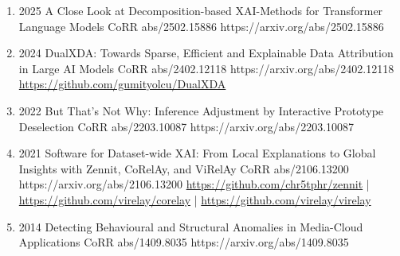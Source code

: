 {\begin{enumerate}
                        
        \item {}
                        {2025}
                        {A Close Look at Decomposition-based XAI-Methods for Transformer Language Models}
                        {CoRR abs/2502.15886}
                        {https://arxiv.org/abs/2502.15886}
                        

        \item {}
                        {2024}
                        {DualXDA: Towards Sparse, Efficient and Explainable Data Attribution in Large AI Models}
                        {CoRR abs/2402.12118}
                        {https://arxiv.org/abs/2402.12118}
                        {\\\href{https://github.com/gumityolcu/DualXDA}{https://github.com/gumityolcu/DualXDA}}
                        

        \item {}
                        {2022}
                        {But That's Not Why: Inference Adjustment by Interactive Prototype Deselection}
                        {CoRR abs/2203.10087}
                        {https://arxiv.org/abs/2203.10087}

        \item {}
                        {2021}
                        {Software for Dataset-wide XAI: From Local Explanations to Global Insights with Zennit, CoRelAy, and ViRelAy}
                        {CoRR abs/2106.13200}
                        {https://arxiv.org/abs/2106.13200}
                        {   \href{https://github.com/chr5tphr/zennit}{https://github.com/chr5tphr/zennit} | \\
                            \href{https://github.com/virelay/corelay}{https://github.com/virelay/corelay} |
                            \href{https://github.com/virelay/virelay}{https://github.com/virelay/virelay}
                        }

        \item {}
                        {2014}
                        {Detecting Behavioural and Structural Anomalies in Media-Cloud Applications}
                        {CoRR abs/1409.8035}
                        {https://arxiv.org/abs/1409.8035}

    \end{enumerate}

}


